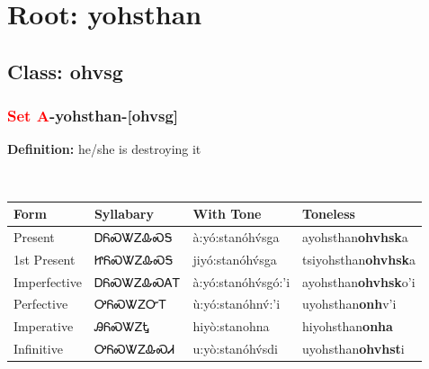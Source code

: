 \needspace{4in}
\section*{Root: yohsthan}
\nopagebreak
{}
\needspace{3in}
\subsection*{Class: ohvsg}
\nopagebreak
\needspace{2in}
\subsubsection*{\textcolor{Red}{Set A}{-}\textbf{yohsthan}{-}[ohvsg]}
\nopagebreak
\textbf{Definition: } he/she is destroying it
\\[0.5em]
\begin{tabularx}{\textwidth}{l X X X}%
\toprule%
\textbf{Form}&\textbf{Syllabary}&\textbf{With Tone}&\textbf{Toneless}\\%
\midrule%
Present&ᎠᏲᏍᏔᏃᎲᏍᎦ&à:yó:stanóhv́sga&ayohsthan\textbf{ohvhsk}a\\%
1st Present&ᏥᏲᏍᏔᏃᎲᏍᎦ&jiyó:stanóhv́sga&tsiyohsthan\textbf{ohvhsk}a\\%
Imperfective&ᎠᏲᏍᏔᏃᎲᏍᎪᎢ&à:yó:stanóhv́sgó:’i&ayohsthan\textbf{ohvhsk}o'i\\%
Perfective&ᎤᏲᏍᏔᏃᏅᎢ&ù:yó:stanóhnv́:’i&uyohsthan\textbf{onh}v'i\\%
Imperative&ᎯᏲᏍᏔᏃᎿ&hiyò:stanohna&hiyohsthan\textbf{onha}\\%
Infinitive&ᎤᏲᏍᏔᏃᎲᏍᏗ&u:yò:stanóhv́sdi&uyohsthan\textbf{ohvhst}i\\%
\bottomrule%
\end{tabularx}
\\[1em]